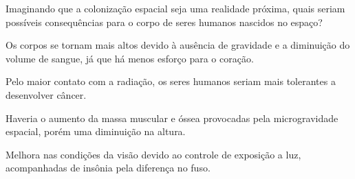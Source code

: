 \pagebreak
Imaginando que a colonização espacial seja uma realidade próxima, quais seriam
possíveis consequências para o corpo de seres humanos nascidos no espaço?

\begin{escolha}
\item
  Os corpos se tornam mais altos devido à ausência de gravidade e a
  diminuição do volume de sangue, já que há menos esforço para o coração.
\item
  Pelo maior contato com a radiação, os seres humanos seriam mais
  tolerantes a desenvolver câncer.
\item
  Haveria o aumento da massa muscular e óssea provocadas pela
  microgravidade espacial, porém uma diminuição na altura.
\item
  Melhora nas condições da visão devido ao controle de exposição a luz,
  acompanhadas de insônia pela diferença no fuso.
\end{escolha}




